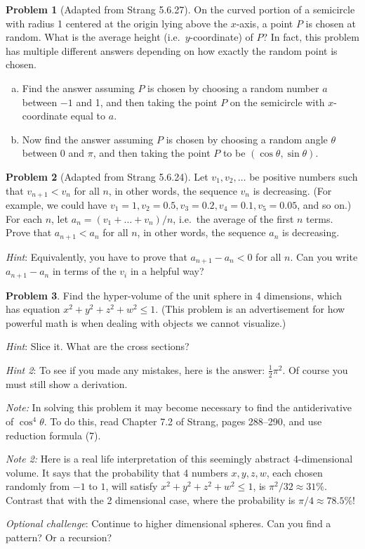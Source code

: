 \documentclass[11pt,oneside]{amsart}
\theoremstyle{definition}
\newtheorem{problem}{Problem}
\begin{document}
    \begin{problem}[Adapted from Strang 5.6.27]
        On the curved portion of a semicircle with radius 1 centered at the origin lying above the $x$-axis, a point $P$ is chosen at random. What is the average height (i.e.\ $y$-coordinate) of $P$? In fact, this problem has multiple different answers depending on how exactly the random point is chosen.
        \begin{enumerate}[(a)]
            \item Find the answer assuming $P$ is chosen by choosing a random number $a$ between $-1$ and 1, and then taking the point $P$ on the semicircle with $x$-coordinate equal to $a$.
            \item Now find the answer assuming $P$ is chosen by choosing a random angle $\theta$ between 0 and $\pi$, and then taking the point $P$ to be $(\cos\theta,\sin\theta)$.
        \end{enumerate}
    \end{problem}

    \begin{problem}[Adapted from Strang 5.6.24]
        Let $v_1,v_2,\dots$ be positive numbers such that $v_{n+1}<v_n$ for all $n$, in other words, the sequence $v_n$ is decreasing. (For example, we could have $v_1=1, v_2=0.5, v_3=0.2, v_4=0.1, v_5=0.05$, and so on.) For each $n$, let $a_n=(v_1+\dots+v_n)/n$, i.e.\ the average of the first $n$ terms. Prove that $a_{n+1}<a_n$ for all $n$, in other words, the sequence $a_n$ is decreasing.

        \emph{Hint}: Equivalently, you have to prove that $a_{n+1}-a_n<0$ for all $n$. Can you write $a_{n+1}-a_n$ in terms of the $v_i$ in a helpful way?
    \end{problem}

    \begin{problem}
        Find the hyper-volume of the unit sphere in 4 dimensions, which has equation $x^2+y^2+z^2+w^2\leq 1$. (This problem is an advertisement for how powerful math is when dealing with objects we cannot visualize.)

        \emph{Hint}: Slice it. What are the cross sections?

        \emph{Hint 2}: To see if you made any mistakes, here is the answer: $\frac12\pi^2$. Of course you must still show a derivation.

        \emph{Note:} In solving this problem it may become necessary to find the antiderivative of $\cos^4\theta$. To do this, read Chapter 7.2 of Strang, pages 288--290, and use reduction formula (7).

        \emph{Note 2:} Here is a real life interpretation of this seemingly abstract 4-dimensional volume. It says that the probability that 4 numbers $x,y,z,w$, each chosen randomly from $-1$ to $1$, will satisfy $x^2+y^2+z^2+w^2\leq 1$, is $\pi^2/32\approx 31\%$. Contrast that with the 2 dimensional case, where the probability is $\pi/4\approx 78.5\%$!

        \emph{Optional challenge}: Continue to higher dimensional spheres. Can you find a pattern? Or a recursion?
    \end{problem}
\end{document}

